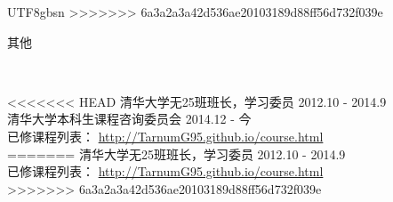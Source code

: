 \documentclass[9pt]{article}
\newenvironment{changemargin}[2]{%
  \begin{list}{}{%
    \setlength{\topsep}{0pt}%
    \setlength{\leftmargin}{#1}%
    \setlength{\rightmargin}{#2}%
    \setlength{\listparindent}{\parindent}%
    \setlength{\itemindent}{\parindent}%
    \setlength{\parsep}{\parskip}%
  }%
  \item[]}{\end{list}
}
\newcommand{\lineover}{
    \begin{changemargin}{-0.05in}{-0.05in}
        \vspace*{-8pt}
        \hrulefill \\
        \vspace*{-2pt}
    \end{changemargin}
}
\newcommand{\header}[1]{
    \begin{changemargin}{-0.5in}{-0.5in}
        \scshape{#1}\\
    \lineover
    \end{changemargin}
}
\newenvironment{body} {
    \vspace*{-16pt}
    \begin{changemargin}{-0.25in}{-0.5in}
  } 
    {\end{changemargin}
}
\begin{document}
\begin{CJK*}{UTF8}{gbsn}
>>>>>>> 6a3a2a3a42d536ae20103189d88ff56d732f039e



\header{其他}

\begin{body}
<<<<<<< HEAD
    \vspace{14pt}
    清华大学无25班班长，学习委员 \hfill 2012.10 - 2014.9\\
    \smallskip
    清华大学本科生课程咨询委员会 \hfill 2014.12 - 今\\
    \smallskip
    已修课程列表： \href{http://tarnumg95.github.io/course.html}{http://TarnumG95.github.io/course.html}\\
=======
	\vspace{14pt}
	清华大学无25班班长，学习委员 \hfill 2012.10 - 2014.9\\
	\smallskip
	已修课程列表： \href{tarnumg95.github.io/course.html}{http://TarnumG95.github.io/course.html}\\
>>>>>>> 6a3a2a3a42d536ae20103189d88ff56d732f039e


\end{body}

\smallskip
\smallskip

\end{CJK*}
\end{document}
